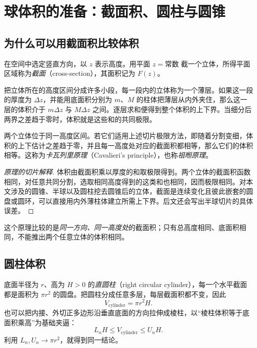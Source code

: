 \documentclass[UTF8,12pt,a4paper,fontset=fandol]{ctexart}
\begin{document}
\section{球体积的准备：截面积、圆柱与圆锥}
\label{sec:cs-solid-preparation}

\subsection{为什么可以用截面积比较体积}

在空间中选定竖直方向，以 $z$ 表示高度。用平面 $z=\text{常数}$ 截一个立体，所得平面区域称为\emph{截面}（cross-section），其面积记为 $F(z)$。

把立体所在的高度区间分成许多小段，每一段内的立体称为一个薄层。如果这一段的厚度为 $\Delta z$，并能用底面积分别为 $m$、$M$ 的柱体把薄层从内外夹住，那么这一层的体积介于 $m\Delta z$ 与 $M\Delta z$ 之间。逐层求和便得到整个体积的上下界。当细分后两界之差趋于零时，体积就是这些和的共同极限。

\begin{theorem}[等高截面积比较]
两个立体位于同一高度区间。若它们适用上述切片极限方法，即随着分割变细，体积的上下估计之差趋于零，并且每一高度处对应的截面积都相等，那么它们的体积相等。这称为\emph{卡瓦列里原理}（Cavalieri's principle），也称\emph{祖暅原理}。
\end{theorem}

\begin{proof}[原理的切片解释]
体积由截面积乘以厚度的和取极限得到。两个立体的截面积函数相同，对任意共同分割，选取相同高度得到的这类和也相同，因而极限相同。对本文涉及的圆锥、半球以及圆柱挖去圆锥后的立体，截面是连续变化且彼此嵌套的圆盘或圆环，可以直接用内外薄柱体建立所需上下界。后文还会写出半球切片的具体误差。
\end{proof}

这个原理比较的是\emph{同一方向、同一高度处}的截面积；只有总高度相同、底面积相同，不能推出两个任意立体的体积相同。

\subsection{圆柱体积}

底面半径为 $r$、高为 $H>0$ 的\emph{直圆柱}（right circular cylinder），每一个水平截面都是面积为 $\pi r^2$ 的圆盘。把圆柱分成任意多层，每层截面积都不变，因此
\begin{equation}\label{eq:cs-cylinder-volume}
  V_{\mathrm{cylinder}}=\pi r^2H.
\end{equation}
也可以把内接、外切正多边形沿垂直底面的方向拉伸成棱柱，以“棱柱体积等于底面积乘高”为基础夹逼：
\[
  L_nH\leq V_{\mathrm{cylinder}}\leq U_nH.
\]
利用 $L_n,U_n\to\pi r^2$，就得到同一结论。
\end{document}

